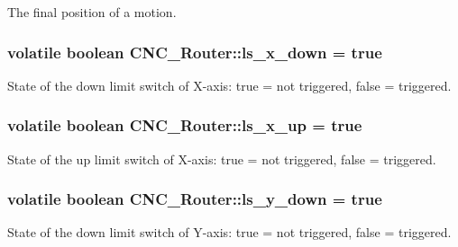 The final position of a motion. 

\hypertarget{class_c_n_c___router_ac4dbdb689d5b4bb2ed39af36ec07d394}{
\subsubsection[{ls\+\_\+x\+\_\+down}]{\setlength{\rightskip}{0pt plus 5cm}volatile boolean C\+N\+C\+\_\+\+Router\+::ls\+\_\+x\+\_\+down = true\hspace{0.3cm}{\ttfamily [static]}}}\label{class_c_n_c___router_ac4dbdb689d5b4bb2ed39af36ec07d394}


State of the down limit switch of X-\/axis\+: true = not triggered, false = triggered. 

\hypertarget{class_c_n_c___router_a63dab669f0dd34b0306c16b61816e751}{
\subsubsection[{ls\+\_\+x\+\_\+up}]{\setlength{\rightskip}{0pt plus 5cm}volatile boolean C\+N\+C\+\_\+\+Router\+::ls\+\_\+x\+\_\+up = true\hspace{0.3cm}{\ttfamily [static]}}}\label{class_c_n_c___router_a63dab669f0dd34b0306c16b61816e751}


State of the up limit switch of X-\/axis\+: true = not triggered, false = triggered. 

\hypertarget{class_c_n_c___router_a1932890e5458f9113355f1bdb854e1ce}{
\subsubsection[{ls\+\_\+y\+\_\+down}]{\setlength{\rightskip}{0pt plus 5cm}volatile boolean C\+N\+C\+\_\+\+Router\+::ls\+\_\+y\+\_\+down = true\hspace{0.3cm}{\ttfamily [static]}}}\label{class_c_n_c___router_a1932890e5458f9113355f1bdb854e1ce}


State of the down limit switch of Y-\/axis\+: true = not triggered, false = triggered. 

